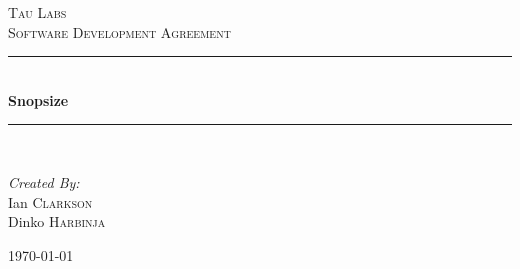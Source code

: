 \begin{titlepage}

\newcommand{\HRule}{\rule{\linewidth}{0.5mm}}

\begin{center}


\textsc{\LARGE Tau Labs}\\[1.5cm]

\textsc{\Large Software Development Agreement}\\[1.5cm]

\HRule \\[0.4cm]
{ \huge \bf Snopsize}\\[0.4cm]
\HRule \\[1.5cm]

\begin{minipage}{0.4\textwidth}
\begin{flushleft} \large
\emph{Created By:}\\
Ian \textsc{Clarkson} \\
Dinko \textsc{Harbinja} 
\end{flushleft}
\end{minipage}

\vfill

{\large \today}

\end{center}

\end{titlepage}
